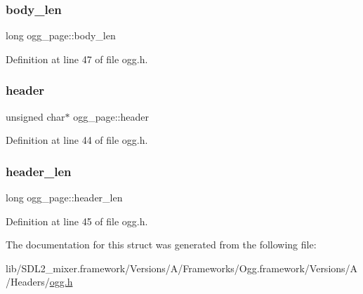 \subsubsection{\texorpdfstring{body\_len}{body\_len}}
{\footnotesize\ttfamily long ogg\+\_\+page\+::body\+\_\+len}



Definition at line 47 of file ogg.\+h.

\mbox{\label{structogg__page_a9f251dc1a96fbfd84ff2585fbbc03c16}} 
\subsubsection{\texorpdfstring{header}{header}}
{\footnotesize\ttfamily unsigned char$\ast$ ogg\+\_\+page\+::header}



Definition at line 44 of file ogg.\+h.

\mbox{\label{structogg__page_aeaa6edc2ff9f2c5cc8f0ecf001936b7b}} 
\subsubsection{\texorpdfstring{header\_len}{header\_len}}
{\footnotesize\ttfamily long ogg\+\_\+page\+::header\+\_\+len}



Definition at line 45 of file ogg.\+h.



The documentation for this struct was generated from the following file\+:\begin{DoxyCompactItemize}
\item 
lib/\+S\+D\+L2\+\_\+mixer.\+framework/\+Versions/\+A/\+Frameworks/\+Ogg.\+framework/\+Versions/\+A/\+Headers/\mbox{\hyperlink{ogg_8h}{ogg.\+h}}\end{DoxyCompactItemize}
